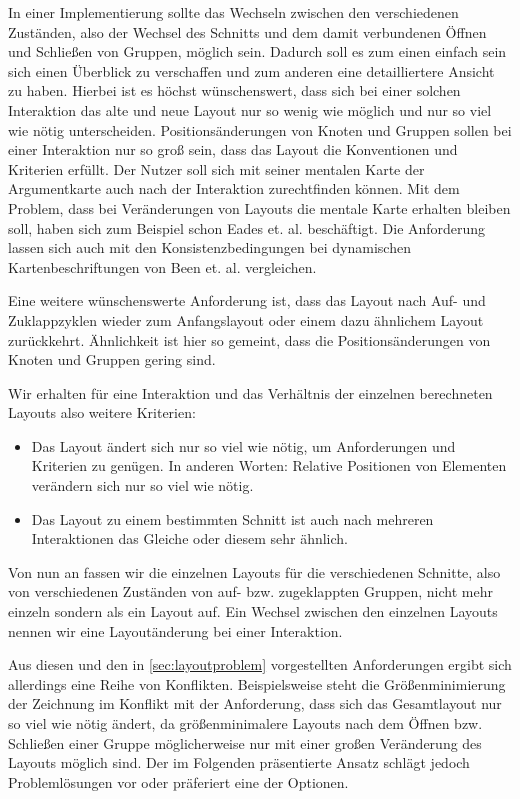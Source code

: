 In einer Implementierung sollte das Wechseln zwischen den verschiedenen Zuständen, also der Wechsel des Schnitts und dem damit verbundenen Öffnen und Schließen von Gruppen, möglich sein. 
Dadurch soll es zum einen einfach sein sich einen Überblick zu verschaffen und zum anderen eine detailliertere Ansicht zu haben.
Hierbei ist es höchst wünschenswert, dass sich bei einer solchen Interaktion das alte und neue Layout nur so wenig wie möglich und nur so viel wie nötig unterscheiden. 
Positionsänderungen von Knoten und Gruppen sollen bei einer Interaktion nur so groß sein, dass das Layout die Konventionen und Kriterien erfüllt.
Der Nutzer soll sich mit seiner mentalen Karte der Argumentkarte auch nach der Interaktion zurechtfinden können. 
Mit dem Problem, dass bei Veränderungen von Layouts die mentale Karte erhalten bleiben soll, haben sich zum Beispiel schon Eades et. al. \cite{eades1991preserving, Misue1995183}
beschäftigt. Die Anforderung lassen sich auch mit den Konsistenzbedingungen bei dynamischen Kartenbeschriftungen von  Been et. al. \cite{Been2010312} vergleichen.

Eine weitere wünschenswerte Anforderung ist, dass das Layout nach  Auf- und Zuklappzyklen 
wieder zum Anfangslayout oder einem dazu ähnlichem Layout zurückkehrt. 
Ähnlichkeit ist hier so gemeint, dass die Positionsänderungen von Knoten und Gruppen gering sind.

Wir erhalten für eine Interaktion und das Verhältnis der einzelnen berechneten Layouts also weitere Kriterien:
\begin{itemize}
\item Das Layout ändert sich nur so viel wie nötig, um Anforderungen und Kriterien zu genügen. 
In anderen Worten: Relative Positionen von Elementen verändern sich nur so viel wie nötig.
\item Das Layout zu einem bestimmten Schnitt ist auch nach mehreren Interaktionen das Gleiche oder diesem sehr ähnlich.
\end{itemize}

Von nun an fassen wir die einzelnen Layouts für die verschiedenen Schnitte, also von verschiedenen Zuständen von auf- bzw. zugeklappten Gruppen, nicht mehr einzeln
sondern als ein Layout auf. Ein Wechsel zwischen den einzelnen Layouts nennen wir eine Layoutänderung bei einer Interaktion.

Aus diesen und den in \autoref{sec:layoutproblem} vorgestellten Anforderungen ergibt sich allerdings eine Reihe von Konflikten.
Beispielsweise steht die Größenminimierung der Zeichnung im Konflikt mit der Anforderung, dass sich das Gesamtlayout nur so viel wie nötig ändert, 
da größenminimalere Layouts nach dem Öffnen bzw. Schließen einer Gruppe möglicherweise nur mit einer großen Veränderung des Layouts möglich sind.
Der im Folgenden präsentierte Ansatz schlägt jedoch Problemlösungen vor oder präferiert eine der Optionen.

